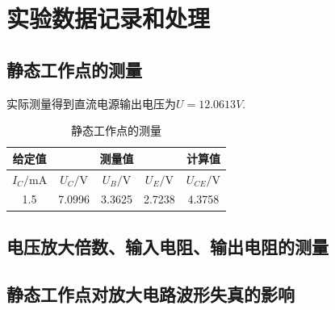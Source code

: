 \documentclass[10.5pt]{config}
\begin{document}
\section{实验数据记录和处理}


\subsection{静态工作点的测量}

实际测量得到直流电源输出电压为$U = 12.0613V$.

\begin{table}[H]
    \centering
    \caption{静态工作点的测量}
    \label{tab:static_point}
    \begin{tabular}{|c|c|c|c|c|}
        \hline
        给定值 & \multicolumn{3}{c|}{测量值} & 计算值 \\ \hline
        $I_C / \mathrm{mA}$ & $U_C / \mathrm{V}$ & $U_B / \mathrm{V}$ & $U_E / \mathrm{V}$ & $U_{CE} / \mathrm{V}$ \\ \hline
        1.5 & 7.0996 & 3.3625 & 2.7238 & 4.3758 \\ \hline
    \end{tabular}
\end{table}

\subsection{电压放大倍数、输入电阻、输出电阻的测量}

\begin{table}[H]
    \centering
    \caption{电压放大倍数、输入电阻、输出电阻的测量}
    \label{tab:dynamic_params}
\end{table}

\subsection{静态工作点对放大电路波形失真的影响}
\end{document}
